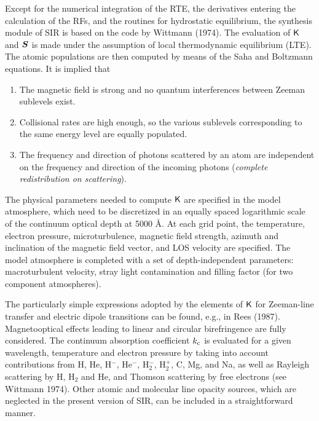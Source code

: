 \documentclass[11pt]{report}
\def\vec#1{\mbox{\boldmath $ #1$}}
\def\tens#1{\ifmmode\mathchoice{\mbox{$\sf\displaystyle#1$}}
{\mbox{$\sf\textstyle#1$}}
{\mbox{$\sf\scriptstyle#1$}}
{\mbox{$\sf\scriptscriptstyle#1$}}\else
\hbox{$\sf\textstyle#1$}\fi}
\begin{document}
Except for the numerical integration of the RTE, the derivatives entering
the calculation of the RFs, and the routines for hydrostatic equilibrium, the
synthesis module of SIR is based on the code by Wittmann (1974). The
evaluation of $\tens{K}$ and $\vec{S}$ is made under the assumption of
local thermodynamic equilibrium (LTE). The atomic populations are then
computed by means of the Saha and Boltzmann equations. It is implied that
\begin{enumerate}
\item The magnetic field is strong and no quantum interferences between
Zeeman sublevels exist.

\item Collisional rates are high enough, so the various sublevels
corresponding to the same energy level are equally populated. 

\item The frequency and direction of photons scattered by an atom are
independent on the frequency and direction of the incoming photons
({\em complete redistribution on scattering}).
\end{enumerate}

The physical parameters needed to compute $\tens{K}$ are specified in
the model atmosphere, which need to be discretized in an equally
spaced logarithmic scale of the continuum optical depth at 5000 \AA\/.
At each grid point, the temperature, electron pressure,
microturbulence, magnetic field strength, azimuth and inclination of
the magnetic field vector, and LOS velocity are specified. The model
atmosphere is completed with a set of depth-independent parameters:
macroturbulent velocity, stray light contamination and filling factor
(for two component atmospheres).

The particularly simple expressions adopted by the elements of
$\tens{K}$ for Zeeman-line transfer and electric dipole transitions can
be found, e.g., in Rees (1987). Magnetooptical effects leading to
linear and circular birefringence are fully considered. The continuum
absorption coefficient $k_{\rm c}$ is evaluated for a given wavelength,
temperature and electron pressure by taking into account
contributions from H, He, H$^{-}$, He$^{-}$, H$_2^-$, H$_2^+$, C, Mg,
and Na, as well as Rayleigh scattering by H, H$_2$ and He, and Thomson
scattering by free electrons (see Wittmann 1974).  Other atomic and
molecular line opacity sources, which are neglected in the present
version of SIR, can be included in a straightforward manner.
\end{document}
